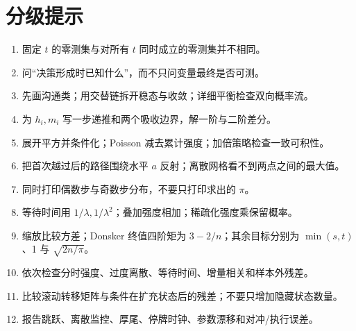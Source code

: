\section*{分级提示}
\begingroup\small
\begin{enumerate}[nosep,leftmargin=*]
  \item 固定 $t$ 的零测集与对所有 $t$ 同时成立的零测集并不相同。
  \item 问“决策形成时已知什么”，而不只问变量最终是否可测。
  \item 先画沟通类；用交替链拆开稳态与收敛；详细平衡检查双向概率流。
  \item 为 $h_i,m_i$ 写一步递推和两个吸收边界，解一阶与二阶差分。
  \item 展开平方并条件化；Poisson 减去累计强度；加倍策略检查一致可积性。
  \item 把首次越过后的路径围绕水平 $a$ 反射；离散网格看不到两点之间的最大值。
  \item 同时打印偶数步与奇数步分布，不要只打印求出的 $\pi$。
  \item 等待时间用 $1/\lambda,1/\lambda^2$；叠加强度相加；稀疏化强度乘保留概率。
  \item 缩放比较方差；Donsker 终值四阶矩为 $3-2/n$；其余目标分别为 $\min(s,t)$、1 与 $\sqrt{2n/\pi}$。
  \item 依次检查分时强度、过度离散、等待时间、增量相关和样本外残差。
  \item 比较滚动转移矩阵与条件在扩充状态后的残差；不要只增加隐藏状态数量。
  \item 报告跳跃、离散监控、厚尾、停牌时钟、参数漂移和对冲/执行误差。
\end{enumerate}
\endgroup


\MFQMappedUpperChElevenHints
